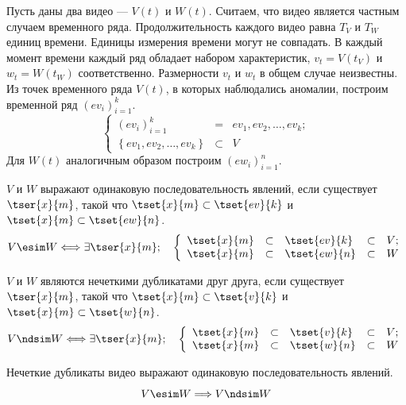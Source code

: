 \documentclass{.local/lib/classes/ndvr-super-article-standalone}
\begin{document}
    Пусть даны два видео — $V(t)$ и $W(t)$.
    Считаем, что видео является частным случаем временного ряда.
    Продолжительность  каждого видео равна $T_{V}$ и $T_{W}$ единиц времени.
    Единицы измерения времени могут не совпадать.
    В каждый момент времени каждый ряд обладает набором характеристик,
    $v_t = V(t_{V})$ и~$w_t = W(t_{W})$  соответственно.
    Размерности $v_t$ и $w_t$  в общем случае неизвестны.
    Из точек временного ряда $V(t)$, в которых наблюдались аномалии, 
    построим временной ряд $(ev_{i})^{k}_{i=1}$.
    \[
        \left\lbrace
            \begin{array}{lcl}
                (ev_{i})^{k}_{i=1} & = &  ev_1, ev_2, \ldots, ev_k; \\
                \left\lbrace ev_1, ev_2, \ldots, ev_k  \right\rbrace & \subset & V 
            \end{array}
        \right.
    \]
    Для $W(t)$ аналогичным образом построим  $(ew_{i})^{n}_{i=1}$.
    \begin{definition}
    $V$ и $W$ выражают одинаковую
    последовательность явлений, если существует $\tser{x}{m}$, 
    такой что $ \tset{x}{m} \subset \tset{ev}{k} $ 
    и~$ \tset{x}{m} \subset \tset{ew}{n}$.
    \[
        V \esim  W \Longleftrightarrow  
        \exists \tser{x}{m}; \quad \left\lbrace
            \begin{array}{lclll}
                \tset{x}{m} & \subset 
                    & \tset{ev}{k} 
                    & \subset & V; \\
                \tset{x}{m} & \subset 
                    & \tset{ew}{n} 
                    & \subset & W 
            \end{array}
        \right.
    \]
    \end{definition}
    \begin{definition}
    $V$ и $W$ являются нечеткими дубликатами друг друга,
    если существует $\tser{x}{m}$, 
    такой что $ \tset{x}{m} \subset \tset{v}{k} $ 
    и~$ \tset{x}{m} \subset \tset{w}{n}$.
    \[
        V \ndsim  W \Longleftrightarrow 
        \exists \tser{x}{m}; \quad \left\lbrace
            \begin{array}{lclll}
                \tset{x}{m} & \subset 
                    & \tset{v}{k} 
                    & \subset & V; \\
                \tset{x}{m} & \subset 
                    & \tset{w}{n} 
                    & \subset & W 
            \end{array}
        \right.
    \]
    \end{definition}
    \begin{statement}[О дубликатах]
        Нечеткие дубликаты видео выражают 
        одинаковую последовательность явлений.
        \[
             V \esim  W \Longrightarrow  V \ndsim  W
        \]
    \end{statement}
\end{document}
